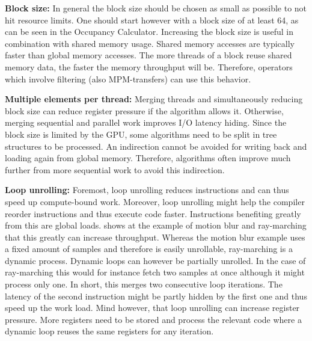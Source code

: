 \documentclass[m,times]{cgMA}
\begin{document}
\textbf{Block size:} In general the block size should be chosen as small as possible to not hit resource limits. One should start however with a block size of at least 64, as can be seen in the Occupancy Calculator. Increasing the block size is useful in combination with shared memory usage. Shared memory accesses are typically faster than global memory accesses. The more threads of a block reuse shared memory data, the faster the memory throughput will be. Therefore, operators which involve filtering (also MPM-transfers) can use this behavior.

\textbf{Multiple elements per thread:} Merging threads and simultaneously reducing block size can reduce register pressure if the algorithm allows it. Otherwise, merging sequential and parallel work improves I/O latency hiding. Since the block size is limited by the GPU, some algorithms need to be split in tree structures to be processed. An indirection cannot be avoided for writing back and loading again from global memory. Therefore, algorithms often improve much further from more sequential work to avoid this indirection.

\textbf{Loop unrolling:} Foremost, loop unrolling reduces instructions and can thus speed up compute-bound work. Moreover, loop unrolling might help the compiler reorder instructions and thus execute code faster. Instructions benefiting greatly from this are global loads. \cite{NVIDIA:PEAK_PERFORMANCE} shows at the example of motion blur and ray-marching that this greatly can increase throughput. Whereas the motion blur example uses a fixed amount of samples and therefore is easily unrollable, ray-marching is a dynamic process. Dynamic loops can however be partially unrolled. In the case of ray-marching this would for instance fetch two samples at once although it might process only one. In short, this merges two consecutive loop iterations. The latency of the second instruction might be partly hidden by the first one and thus speed up the work load. Mind however, that loop unrolling can increase register pressure. More registers need to be stored and process the relevant code where a dynamic loop reuses the same registers for any iteration.

\begin{flushright}\cite{AMD:GPU_OPEN}\cite{NVIDIA:BEST:PRACTICE}\cite{NVIDIA:PEAK_PERFORMANCE}\end{flushright}
\end{document}
